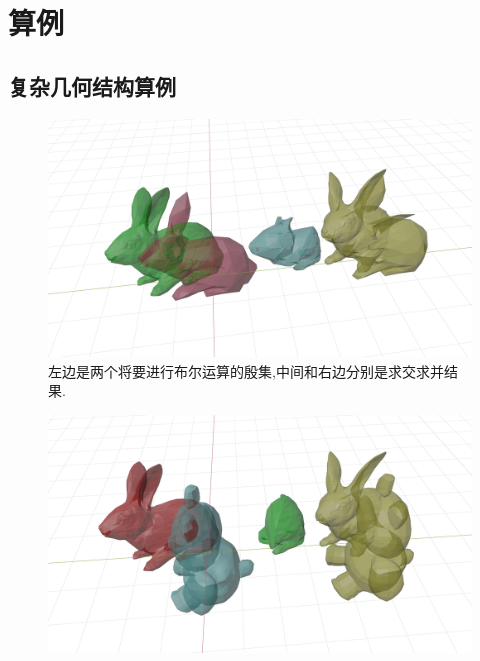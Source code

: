 \documentclass[a4paper]{book}
\numberwithin{equation}{chapter}
\theoremstyle{definition}
\begin{document}
\chapter{算例}

\section{复杂几何结构算例}

\begin{figure}
    \caption{左边是两个将要进行布尔运算的殷集,中间和右边分别是求交求并结果.}
    \includegraphics[width = 18cm]{fig/s3s1.png}
\end{figure}

\begin{figure}
    \includegraphics[width = 18cm]{fig/s3s2.png}
\end{figure}
\end{document}
